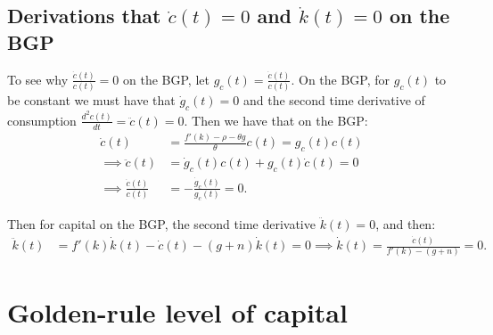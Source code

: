 \documentclass[../main.tex]{subfiles}
\begin{document}
    \subsection{Derivations that $\dot c(t) = 0$ and $\dot k(t) = 0$ on the BGP}
    
        To see why $\frac{\dot c(t)}{c(t)} = 0$ on the BGP, let $g_c(t) = \frac{\dot c(t)}{c(t)}$. On the BGP, for $g_c(t)$ to be constant we must have that $\dot g_c(t) = 0$ and the second time derivative of consumption $\frac{d^2 c(t)}{dt} = \ddot c(t) = 0$. \? Then we have that on the BGP:
        \begin{align}
            \dot c(t)
            &= \frac{f'(k) - \rho - \theta g}{\theta} c(t)
            = g_c(t) c(t)
            \\
            \implies
            \ddot c(t)
            &= \dot g_c(t) c(t) +  g_c(t) \dot c(t) = 0
            \\
            \implies
            \frac{\dot c(t)}{c(t)}
            &= -\frac{\dot g_c(t)}{g_c(t)} = 0.
        \end{align}
        
        Then for capital on the BGP, the second time derivative $\ddot k(t) = 0$, and then:
        \begin{align}
            \ddot k(t)
            &= f'(k) \dot k(t) - \dot c(t) - (g+n) \dot k(t) = 0
            \implies
            \dot k(t) = \frac{\dot c(t)}{f'(k) - (g+n)} = 0.
        \end{align}
        
    \section{Golden-rule level of capital}\label{sec:RCK-GR}
        
\end{document}
